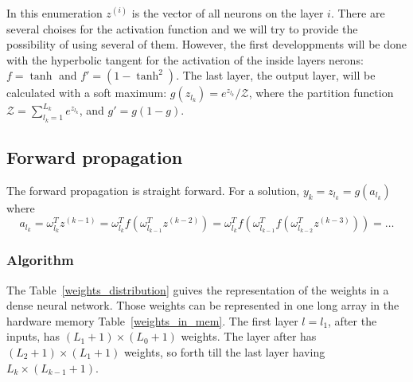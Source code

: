 \documentclass[final, paper=letter,5p,times,twocolumn]{elsarticle}
\begin{document}
In this enumeration $z^{(i)}$ is the vector of all neurons on the layer $i$. There are several choises for the activation function and we will try to provide the possibility of using several of them. However, the first developpments will be done with the hyperbolic tangent for the activation of the inside layers nerons: $f = \tanh$ and $f' = (1 - \tanh^{2})$. The last layer, the output layer, will be calculated with a soft maximum: $g(z_{l_{k}}) = e^{z_{l_{k}}} / \mathcal{Z}$, where the partition function $\mathcal{Z} = \sum_{l_{k} = 1}^{L_{k}} e^{z_{l_{k}}}$, and $g' = g(1 - g)$.
  
\subsection{Forward propagation}

The forward propagation is straight forward. For a solution, $y_{k} = z_{l_{k}} = g(a_{l_{k}})$ where
$$
a_{l_{k}} = \omega_{l_{k}}^{T} z^{(k-1)} = \omega_{l_{k}}^{T} f(\omega_{l_{k-1}}^{T} z^{(k-2)}) = \omega_{l_{k}}^{T} f(\omega_{l_{k-1}}^{T} f(\omega_{l_{k-2}}^{T} z^{(k-3)})) = \dots
$$

\subsubsection{Algorithm}

The Table~\ref{weights_distribution} guives the representation of the weights in a dense neural network. Those weights can be represented in one long array in the hardware memory Table~\ref{weights_in_mem}. The first layer $l = l_{1}$, after the inputs, has $(L_{1}+1)\times(L_{0}+1)$ weights. The layer after has $(L_{2}+1)\times(L_{1}+1)$ weights, so forth till the last layer having $L_{k}\times(L_{k-1}+1)$.
\end{document}
